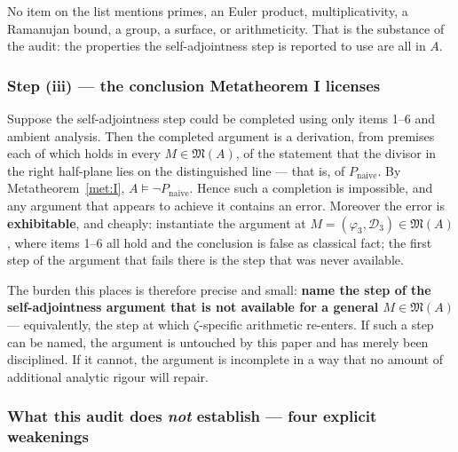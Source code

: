 \documentclass[11pt]{amsart}
\theoremstyle{remark}
\begin{document}
No item on the list mentions primes, an Euler product, multiplicativity,
a Ramanujan bound, a group, a surface, or arithmeticity. That is the
substance of the audit: the properties the self-adjointness step is
reported to use are all in $A$.

\subsubsection{Step (iii) --- the conclusion Metatheorem I licenses}

Suppose the self-adjointness step could be completed using only items
1--6 and ambient analysis. Then the completed argument is a derivation,
from premises each of which holds in every $M\in\mathfrak M(A)$, of the
statement that the divisor in the right half-plane lies on the
distinguished line --- that is, of $P_{\mathrm{naive}}$. By
Metatheorem~\ref{met:I}, $A\models\neg P_{\mathrm{naive}}$. Hence such a
completion is impossible, and any argument that appears to achieve it
contains an error. Moreover the error is \textbf{exhibitable}, and
cheaply: instantiate the argument at
$M=(\varphi_3,\mathcal D_3)\in\mathfrak M(A)$, where items 1--6 all hold
and the conclusion is false as classical fact; the first step of the
argument that fails there is the step that was never available.

The burden this places is therefore precise and small: \textbf{name the
step of the self-adjointness argument that is not available for a
general $M\in\mathfrak M(A)$} --- equivalently, the step at which
$\zeta$-specific arithmetic re-enters. If such a step can be named, the
argument is untouched by this paper and has merely been disciplined. If
it cannot, the argument is incomplete in a way that no amount of
additional analytic rigour will repair.

\subsubsection{What this audit does \emph{not} establish --- four explicit weakenings}
\end{document}
